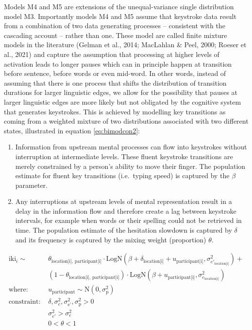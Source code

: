\documentclass[
  man,floatsintext]{apa7}
\begin{document}
Models M4 and M5 are extensions of the unequal-variance single distribution model M3. Importantly models M4 and M5 assume that keystroke data result from a combination of two data generating processes -- consistent with the cascading account -- rather than one. These model are called finite mixture models in the literature (Gelman et al., 2014; MacLahlan \& Peel, 2000; Roeser et al., 2021) and capture the assumption that processing at higher levels of activation leads to longer pauses which can in principle happen at transition before sentence, before words or even mid-word. In other words, instead of assuming that there is one process that shifts the distribution of transition durations for larger linguistic edges, we allow for the possibility that pauses at larger linguistic edges are more likely but not obligated by the cognitive system that generates keystrokes. This is achieved by modelling key transitions as coming from a weighted mixture of two distributions associated with two different states, illustrated in equation \ref{eq:bimodcon2}:

\begin{enumerate}
\def\labelenumi{\arabic{enumi}.}
\item
  Information from upstream mental processes can flow into keystrokes without interruption at intermediate levels. These fluent keystroke transitions are merely constrained by a person's ability to move their finger. The population estimate for fluent key transitions (i.e.~typing speed) is captured by the \(\beta\) parameter.
\item
  Any interruptions at upstream levels of mental representation result in a delay in the information flow and therefore create a lag between keystroke intervals, for example when words or their spelling could not be retrieved in time. The population estimate of the hesitation slowdown is captured by \(\delta\) and its frequency is captured by the mixing weight (proportion) \(\theta\).
\end{enumerate}

\begin{equation}
\begin{aligned}
\label{eq:bimodcon2}
  \text{iki}_{i} \sim\text{ } & \theta_\text{location[i], participant[i]} \cdot \text{LogN}(\beta + \delta_\text{location[i]} + u_\text{participant[i]}, \sigma_{e'_\text{location[i]}}^2) + \\
& (1 - \theta_\text{location[i], participant[i]}) \cdot \text{LogN}(\beta + u_\text{participant[i]}, \sigma_{e_\text{location[i]}}^2)\\
\text{where: } & u_\text{participant} \sim \text{N}(0, \sigma_\text{p}^2) \\
\text{constraint: } & \delta, \sigma_{e}^2, \sigma_\text{e'}^2, \sigma_\text{p}^2>0\\
& \sigma_{e'}^2 > \sigma_{e}^2\\
      & 0 < \theta < 1
\end{aligned}
\end{equation}
\end{document}
